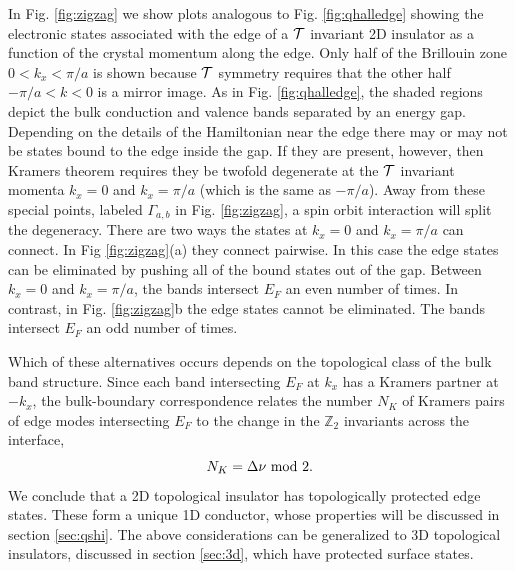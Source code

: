 \documentclass[twocolumn,floatfix,showpacs,rmp,aps]{revtex4}
\begin{document}
In Fig. \ref{fig:zigzag} we show plots analogous to Fig. \ref{fig:qhalledge} showing the electronic
states associated with the edge of a ${\cal T}$ invariant 2D
insulator as a function of the crystal momentum along the edge.  Only
half of the Brillouin zone $0<k_x<\pi/a$ is shown because ${\cal T}$
symmetry requires that the other
half $-\pi/a<k<0$ is a mirror image.  As in Fig. \ref{fig:qhalledge}, the
shaded regions depict the bulk conduction and valence bands separated by an
energy gap.  Depending on the details of the Hamiltonian near the
edge there may or may not be states bound to the edge inside the gap.
If they are present, however, then Kramers
theorem requires they be twofold degenerate at the ${\cal T}$
invariant momenta $k_x=0$ and $k_x=\pi/a$ (which is the same as
$-\pi/a$). Away from these special points, labeled $\Gamma_{a,b}$ in
Fig. \ref{fig:zigzag}, a spin orbit
interaction will split the degeneracy.  There are two
ways the states at $k_x=0$ and $k_x=\pi/a$ can connect.  In
Fig \ref{fig:zigzag}(a) they connect pairwise.  In this case
the edge states can be eliminated by pushing all of the bound
states out of the gap. Between $k_x=0$ and $k_x=\pi/a$, the bands intersect
$E_F$ an even number of times. In contrast, in Fig. \ref{fig:zigzag}b the
edge states cannot be eliminated.  The bands intersect $E_F$
an odd number of times.

Which of these alternatives occurs depends on
the topological class of the bulk band structure.  Since each band intersecting
$E_F$ at $k_x$ has a Kramers partner at $-k_x$, the bulk-boundary
correspondence relates the number $N_K$ of Kramers pairs of edge
modes intersecting $E_F$ to the change in the $\mathbb{Z}_2$
invariants across the interface,
\begin{equation}
N_K = \Delta \nu \ {\rm mod} \ 2.
\end{equation}
We conclude that a 2D topological insulator has
topologically protected edge states.  These form a unique
1D conductor, whose properties will be discussed in section
\ref{sec:qshi}.  The above considerations can be generalized to
3D topological insulators, discussed in section \ref{sec:3d},
which have protected surface states.
\end{document}
